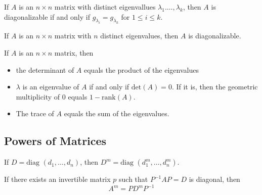 \documentclass[english,12pt]{article}
\begin{document}
\begin{thrm}
If $A$ is an $n \times n$ matrix with distinct eigenvallues $\lambda_1.\dots,\lambda_k$, then $A$ is diagonalizable if and only if $g_{\lambda_i} = g_{\lambda_k}$ for $1 \leq i \leq k$.
\end{thrm}

\begin{thrm}
If $A$ is an $n \times n$ matrix with $n$ distinct eigenvalues, then $A$ is diagonalizable.
\end{thrm}

\begin{thrm}
If $A$ is an $n\times n$ matrix, then
\begin{itemize}
\item the determinant of $A$ equals the product of the eigenvalues
\item $\lambda$ is an eigenvalue of $A$ if and only if $\text{det}(A) = 0$. If it is, then the geometric multiplicity of $0$ equals $1 - \text{rank}(A)$.
\item The trace of $A$ equals the sum of the eigenvalues.
\end{itemize}
\end{thrm}

\subsection{Powers of Matrices}

\begin{thrm}
If $D = \text{diag }(d_1,\dots,d_{n})$, then $D^m = \text{diag }(d_1^m,\dots,d_n^m)$.
\end{thrm}

\begin{thrm}
If there exists an invertible matrix $p$ such that $P^{-1}AP = D$ is diagonal, then
\[A^m = PD^mP^{-1}\]
\end{thrm}
\end{document}
